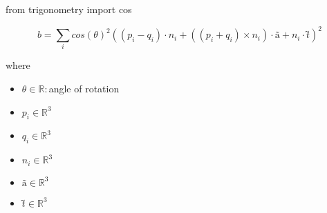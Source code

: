 \documentclass[12pt]{article}
\begin{document}
from trigonometry import cos

\[
\textit{b} = \sum_\textit{i} cos(\textit{θ})^{2}((\textit{p}_{ \textit{i} } - \textit{q}_{ \textit{i} }) \cdot \textit{n}_{ \textit{i} } + ((\textit{p}_{ \textit{i} } + \textit{q}_{ \textit{i} }) × \textit{n}_{ \textit{i} }) \cdot \textit{ã} + \textit{n}_{ \textit{i} } \cdot \textit{t̃})^{2}
\]

where
\begin{itemize}
\item $\textit{θ} \in \mathbb{{R}}:$angle of rotation
\item $\textit{p}_{\textit{i}} \in \mathbb{R}^{ 3}$
\item $\textit{q}_{\textit{i}} \in \mathbb{R}^{ 3}$
\item $\textit{n}_{\textit{i}} \in \mathbb{R}^{ 3}$
\item $\textit{ã} \in \mathbb{R}^{ 3}$
\item $\textit{t̃} \in \mathbb{R}^{ 3}$
\end{itemize}
\end{document}
